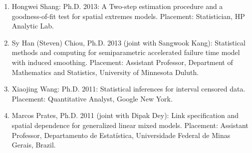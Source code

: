 \documentclass[Statistics]{vita}
\begin{document}
\begin{vita}
\begin{enumerate}
    \item Hongwei Shang: Ph.D. 2013: A Two-step estimation procedure and a goodness-of-fit test for spatial extremes models. Placement: Statistician, HP Analytic Lab.
    \item Sy Han (Steven) Chiou, Ph.D. 2013 (joint with Sangwook Kang): Statistical methods and computing for semiparametric accelerated failure time model with induced smoothing. Placement: Assistant Professor, Department of Mathematics and Statistics, University of Minnesota Duluth.
    \item Xiaojing Wang: Ph.D. 2011: Statistical inferences for interval censored data. Placement: Quantitative Analyst, Google New York.
    \item Marcos Prates, Ph.D. 2011 (joint with Dipak Dey): Link specification and spatial dependence for generalized linear mixed models. Placement: Assistant Professor, Departamento de Estat\'{i}stica, Universidade Federal de Minas Gerais, Brazil.
    \end{enumerate}

\end{vita}
\end{document}
